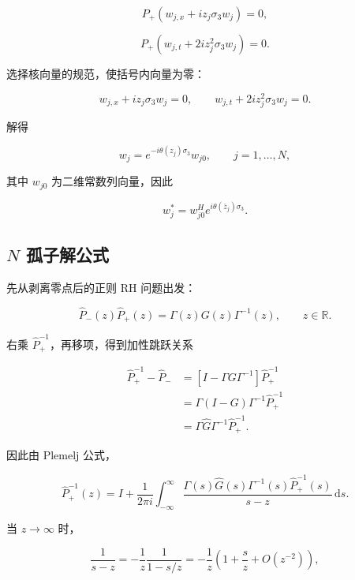 \documentclass[
    lang=cn,
    scheme=chinese,
    mode=simple,
    device=normal,
    color=blue,
    math=cm,
    thmcnt=section,
    12pt
]{elegantbook}
\begin{document}
\[
    P_+\left(w_{j,x}+iz_j\sigma_3w_j\right)=0,
\]

\[
    P_+\left(w_{j,t}+2iz_j^2\sigma_3w_j\right)=0.
\]

选择核向量的规范，使括号内向量为零：

\[
    w_{j,x}+iz_j\sigma_3w_j=0,
    \qquad
    w_{j,t}+2iz_j^2\sigma_3w_j=0.
\]

解得

\begin{equation}
    w_j
    =
    e^{-i\theta(z_j)\sigma_3}w_{j0},
    \qquad
    j=1,\ldots,N,
    \tag{5.4.5}
    \label{eq:5.4.5}
\end{equation}

其中 $w_{j0}$ 为二维常数列向量，因此

\begin{equation}
    w_j^*
    =
    w_{j0}^He^{i\theta(\bar z_j)\sigma_3}.
    \tag{5.4.6}
    \label{eq:5.4.6}
\end{equation}

\subsection{\texorpdfstring{$N$}{N} 孤子解公式}

先从剥离零点后的正则 RH 问题出发：

\[
    \widehat P_-(z)\widehat P_+(z)
    =
    \Gamma(z)G(z)\Gamma^{-1}(z),
    \qquad z\in\mathbb R.
\]

右乘 $\widehat P_+^{-1}$，再移项，得到加性跳跃关系

\[
    \begin{aligned}
        \widehat P_+^{-1}-\widehat P_-
        & =
        \left[I-\Gamma G\Gamma^{-1}\right]\widehat P_+^{-1} \\
        & =
        \Gamma(I-G)\Gamma^{-1}\widehat P_+^{-1} \\
        & =
        \Gamma\widehat G\Gamma^{-1}\widehat P_+^{-1}.
    \end{aligned}
\]

因此由 Plemelj 公式，

\[
    \widehat P_+^{-1}(z)
    =
    I+
    \dfrac{1}{2\pi i}
    \int_{-\infty}^{\infty}
    \dfrac{
        \Gamma(s)\widehat G(s)\Gamma^{-1}(s)\widehat P_+^{-1}(s)
    }{s-z}
    \,\mathrm ds.
\]

当 $z\to\infty$ 时，

\[
    \dfrac{1}{s-z}
    =
    -\dfrac{1}{z}\dfrac{1}{1-s/z}
    =
    -\dfrac{1}{z}
    \left(1+\dfrac{s}{z}+O(z^{-2})\right),
\]
\end{document}
